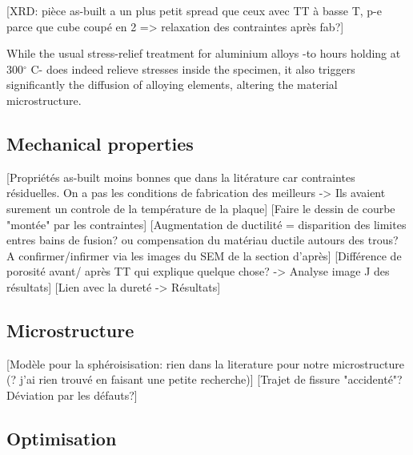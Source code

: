 [XRD: pièce as-built a un plus petit spread que ceux avec TT à basse T, p-e parce que cube coupé en 2 => relaxation des contraintes après fab?]

While the usual stress-relief treatment for aluminium alloys -to hours holding at 300$^\circ$ C- does indeed relieve stresses inside the specimen, it also triggers significantly the diffusion of alloying elements, altering the material microstructure.

\subsection{Mechanical properties}
[Propriétés as-built moins bonnes que dans la litérature car contraintes résiduelles. On a pas les conditions de fabrication des meilleurs -> Ils avaient surement un controle de la température de la plaque] 
[Faire le dessin de courbe "montée" par les contraintes]
[Augmentation de ductilité = disparition des	limites entres bains de fusion? ou compensation du matériau ductile autours des trous? A confirmer/infirmer via les images du SEM de la section d'après]
[Différence de porosité avant/ après TT qui explique quelque chose? -> Analyse image J des résultats]
[Lien avec la dureté -> Résultats]

\subsection{Microstructure}
[Modèle pour la sphéroisisation: rien dans la literature pour notre microstructure (? j'ai rien trouvé en faisant une petite recherche)]
[Trajet de fissure "accidenté"? Déviation par les défauts?]


\label{D-MP}

\subsection{Optimisation}



